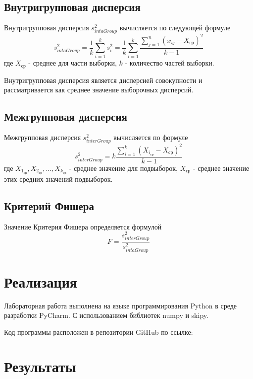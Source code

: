 \documentclass[a4paper, 12pt]{article}
\begin{document}
\subsection{Внутригрупповая дисперсия}

Внутригрупповая дисперсия $s^2_{intaGroup}$ вычисляется по следующей формуле
\begin{equation}
	s^2_{intaGroup} = \frac{1}{k}\sum^k_{i=1}s_i^2 = \frac{1}{k}\sum^k_{i=1} \frac{\sum^n_{j=1} (x_{ij} - X_{\mbox{ср}})^2}{k-1}
\label{eq:1}
\end{equation}
где $X_{\mbox{ср}}$ - среднее для части выборки, $k$ - количество частей выборки.

Внутригрупповая дисперсия является дисперсией совокупности и рассматривается как среднее значение выборочных дисперсий.

\subsection{Межгрупповая дисперсия}

Межгрупповая дисперсия $s^2_{interGroup}$ вычисляется по формуле
\begin{equation}
	s^2_{interGroup} = k \frac{\sum^k_{i=1}(X_{i_{\mbox{ср}}} - X_{\mbox{ср}})^2}{k-1}
\label{eq:2}
\end{equation}
где $X_{1_{\mbox{ср}}}, X_{2_{\mbox{ср}}},...,X_{k_{\mbox{ср}}}$ - среднее значение для подвыборок, $X_{\mbox{ср}}$ - среднее значение этих средних значений подвыборок.

\subsection{Критерий Фишера}

Значение Критерия Фишера определяется формулой
\begin{equation}
	F = \frac{s^2_{interGroup}}{s^2_{intaGroup}}
	\label{eq:3}
\end{equation}

\newpage
\section{Реализация}

Лабораторная работа выполнена на языке программирования Python в среде разработки PyCharm. С использованием библиотек numpy и skipy.

Код программы расположен в репозитории GitHub по ссылке: \url{}

\newpage
\section{Результаты}
\end{document}
